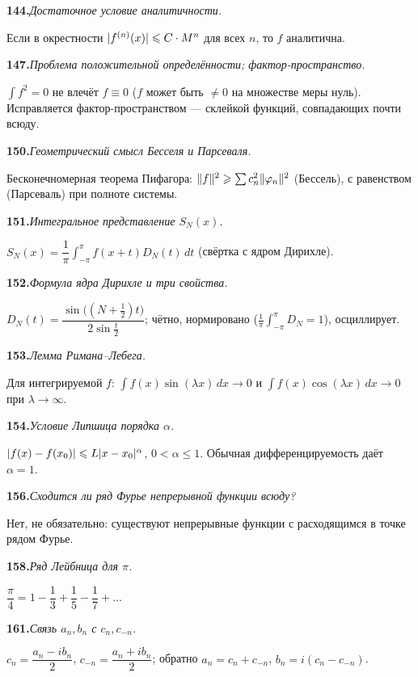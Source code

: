 \documentclass[10pt,a4paper]{article}
\newcommand{\dx}{\,dx}
\newcommand{\dt}{\,dt}
\renewcommand{\le}{\leqslant}
\renewcommand{\ge}{\geqslant}
\DeclarePairedDelimiter{\abs}{\lvert}{\rvert}
\DeclarePairedDelimiter{\norm}{\lVert}{\rVert}
\theoremstyle{definition}
\theoremstyle{plain}
\newcommand{\writespace}{\vspace{7.5mm}}
\newcommand{\faq}[3]{%
  \par\smallskip\noindent
  \textbf{#1.}\enspace\textit{#2}\par
  \nobreak\vspace{0.3ex}\noindent #3\par
  \writespace}
\begin{document}
\faq{144}{Достаточное условие аналитичности.}{%
Если в окрестности $\abs{f^{(n)}(x)}\le C\cdot M^n$ для всех $n$, то $f$ аналитична.}

\faq{147}{Проблема положительной определённости; фактор-пространство.}{%
$\int f^2=0$ не влечёт $f\equiv0$ ($f$ может быть $\ne0$ на множестве меры нуль). Исправляется
фактор-пространством — склейкой функций, совпадающих почти всюду.}

\faq{150}{Геометрический смысл Бесселя и Парсеваля.}{%
Бесконечномерная теорема Пифагора: $\norm{f}^2\ge\sum c_n^2\norm{\varphi_n}^2$ (Бессель), с
равенством (Парсеваль) при полноте системы.}

\faq{151}{Интегральное представление $S_N(x)$.}{%
$S_N(x)=\dfrac1\pi\int_{-\pi}^\pi f(x+t)D_N(t)\dt$ (свёртка с ядром Дирихле).}

\faq{152}{Формула ядра Дирихле и три свойства.}{%
$D_N(t)=\dfrac{\sin\bigl((N+\frac12)t\bigr)}{2\sin\frac t2}$; чётно, нормировано
($\frac1\pi\int_{-\pi}^\pi D_N=1$), осциллирует.}

\faq{153}{Лемма Римана–Лебега.}{%
Для интегрируемой $f$: $\int f(x)\sin(\lambda x)\dx\to0$ и $\int f(x)\cos(\lambda x)\dx\to0$ при
$\lambda\to\infty$.}

\faq{154}{Условие Липшица порядка $\alpha$.}{%
$\abs{f(x)-f(x_0)}\le L\abs{x-x_0}^\alpha$, $0<\alpha\le1$. Обычная дифференцируемость даёт
$\alpha=1$.}

\faq{156}{Сходится ли ряд Фурье непрерывной функции всюду?}{%
Нет, не обязательно: существуют непрерывные функции с расходящимся в точке рядом Фурье.}

\faq{158}{Ряд Лейбница для $\pi$.}{%
$\dfrac\pi4=1-\dfrac13+\dfrac15-\dfrac17+\dots$}

\faq{161}{Связь $a_n,b_n$ с $c_n,c_{-n}$.}{%
$c_n=\dfrac{a_n-ib_n}2$, $c_{-n}=\dfrac{a_n+ib_n}2$; обратно $a_n=c_n+c_{-n}$, $b_n=i(c_n-c_{-n})$.}
\end{document}
